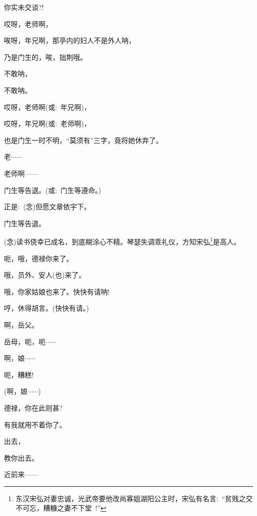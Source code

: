 {{你实未交谈?!}

{哎呀，老师啊，}

{唉呀，年兄啊，那亭内的妇人不是外人呐，}

{乃是门生的，唉，拙荆哦。}

{不敢呐，}

{不敢呐。}

{哎呀，老师啊({\akai 或}:~年兄啊)，}

{哎呀，年兄啊({\akai 或}:~老师啊)，}

{也是门生一时不明，``莫须有''三字，竟将她休弃了。}

{老$\cdots{}\cdots{}$}

{老师啊------}


{门生等告退。({\akai 或}:~门生等遵命。)}

{正是:~({\akai 念})但愿文章依宇下。}

{门生等告退。}

\vspace{5pt}


{({\akai 念})读书侥幸已成名，到底糊涂心不精。琴瑟失调乖礼仪，方知宋弘\footnote{东汉宋弘对妻忠诚，光武帝要他改尚寡姐湖阳公主时，宋弘有名言:~``贫贱之交不可忘，糟糠之妻不下堂~!''}是高人。}

{呃，哦，德禄你来了。}

{哦，员外、安人(也)来了。}

{哦，你家姑娘也来了。快快有请呐!}

{哼，休得胡言。(快快有请。)}

{啊，岳父。}

{岳母，呃，呃$\cdots{}\cdots{}$}

{啊，娘$\cdots{}\cdots{}$}

{呃，糟糕!}

{(啊，娘$\cdots{}\cdots{}$)}

{德禄，你在此则甚?}

{有我就用不着你了。}

{出去，}

{教你出去。}

{近前来------}

}
